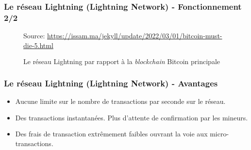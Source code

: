 \begin{frame}
	\frametitle{Le réseau Lightning (Lightning Network) - Fonctionnement 2/2}
	\begin{figure}[h!]
		{\scriptsize Source: \url{https://issam.ma/jekyll/update/2022/03/01/bitcoin-must-die-5.html}}

		\caption{Le réseau Lightning par rapport à la \textit{blockchain} Bitcoin principale}

	\end{figure}

\end{frame}

\begin{frame}
	\frametitle{Le réseau Lightning (Lightning Network) - Avantages}
	\begin{itemize}
		\item Aucune limite sur le nombre de transactions par seconde sur le réseau.
		      \newline
		\item Des transactions instantanées. Plus d’attente de confirmation par les mineurs.
		      \newline
		\item Des frais de transaction extrêmement faibles ouvrant la voie aux micro-transactions.
	\end{itemize}
\end{frame}

